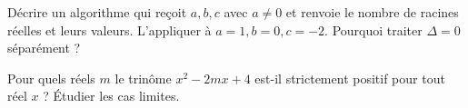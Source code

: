 \documentclass[11pt,a4paper]{article}
\begin{document}
\par\noindent\begin{minipage}{\linewidth}
Décrire un algorithme qui reçoit $a,b,c$ avec $a\ne0$ et renvoie le nombre de racines réelles et leurs valeurs. L’appliquer à $a=1,b=0,c=-2$. Pourquoi traiter $\Delta=0$ séparément ?
\end{minipage}\par
\par\noindent\begin{minipage}{\linewidth}
Pour quels réels $m$ le trinôme $x^2-2mx+4$ est-il strictement positif pour tout réel $x$ ? Étudier les cas limites.
\end{minipage}\par
\end{document}
